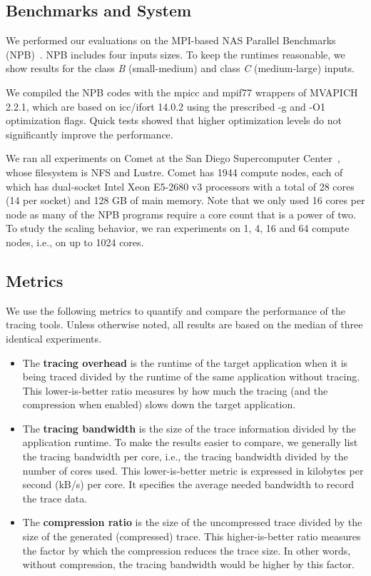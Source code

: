 \subsection{Benchmarks and System}

We performed our evaluations on the MPI-based NAS Parallel Benchmarks (NPB)~\cite{nas}.
%
NPB includes four inputs sizes.
%
To keep the runtimes reasonable, we show results for the class \textit{B} (small-medium) and class \textit{C} (medium-large) inputs.
%

We compiled the NPB codes with the mpicc and mpif77 wrappers of MVAPICH 2.2.1, which are based on icc/ifort 14.0.2 using the prescribed -g and -O1 optimization flags.
%
Quick tests showed that higher optimization levels do not significantly improve the performance.
%

We ran all experiments on Comet at the San Diego Supercomputer Center~\cite{comet}, whose filesystem is NFS and Lustre.
%
Comet has 1944 compute nodes, each of which has dual-socket Intel Xeon E5-2680 v3 processors with a total of 28 cores (14 per socket) and 128 GB of main memory.
%
Note that we only used 16 cores per node as many of the NPB programs require a core count that is a power of two.
%
To study the scaling behavior, we ran experiments on 1, 4, 16 and 64 compute nodes, i.e., on up to 1024 cores.

\subsection{Metrics}

We use the following metrics to quantify and compare the performance of the tracing tools.
%
Unless otherwise noted, all results are based on the median of three identical experiments.
%
\begin{itemize}
\item The \textbf{tracing overhead} is the runtime of the target application when it is being traced divided by the runtime of the same application without tracing.
%
This lower-is-better ratio measures by how much the tracing (and the compression when enabled) slows down the target application.
%
\item The \textbf{tracing bandwidth} is the size of the trace information divided by the application runtime.
%
To make the results easier to compare, we generally list the tracing bandwidth per core, i.e., the tracing bandwidth divided by the number of cores used.
%
This lower-is-better metric is expressed in kilobytes per second (kB/s) per core.
%
It specifies the average needed bandwidth to record the trace data.
%
\item The \textbf{compression ratio} is the size of the uncompressed trace divided by the size of the generated (compressed) trace.
%
This higher-is-better ratio measures the factor by which the compression reduces the trace size.
%
In other words, without compression, the tracing bandwidth would be higher by this factor.
\end{itemize}


